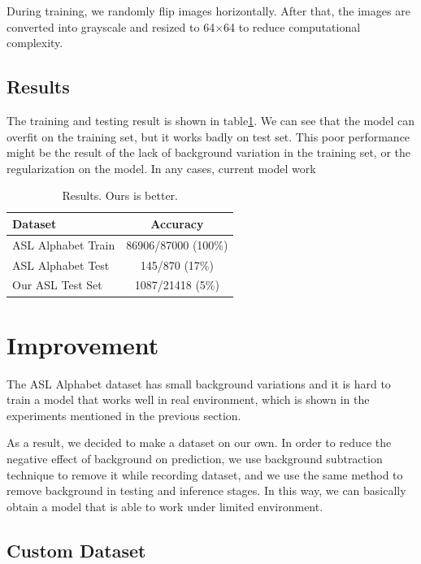 \documentclass[10pt,twocolumn,letterpaper]{article}
\begin{document}
During training, we randomly flip images horizontally. After that, the images are converted into grayscale and resized to 64$\times$64 to reduce computational complexity. 

\subsection{Results}

The training and testing result is shown in table\ref{table:result}. We can see   that the model can overfit on the training set, but it works badly on test set. This poor performance might be the result of the lack of background variation in the training set, or the regularization on the model. In any cases, current model work 

\begin{table}[h]
\begin{center}
\begin{tabular}{|l|c|}
\hline
Dataset & Accuracy \\
\hline\hline
ASL Alphabet Train & 86906/87000 (100\%) \\
ASL Alphabet Test & 145/870 (17\%) \\
Our ASL Test Set & 1087/21418 (5\%) \\
\hline
\end{tabular}
\end{center}
\caption{Results.   Ours is better.}
\label{table:result}
\end{table}

\section{Improvement}

The ASL Alphabet dataset has small background variations and it is hard to train a model that works well in real environment, which is shown in the experiments mentioned in the previous section.

As a result, we decided to make a dataset on our own. In order to reduce the negative effect of background on prediction, we use background subtraction technique to remove it while recording dataset, and we use the same method to remove background in testing and inference stages. In this way, we can basically obtain a model that is able to work under limited environment.

\subsection{Custom Dataset}
\end{document}
